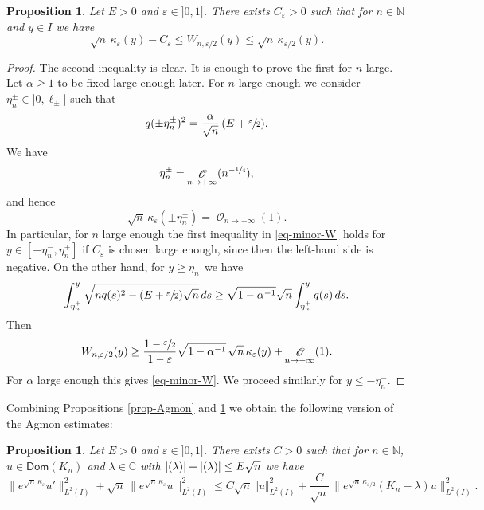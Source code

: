 \documentclass[11pt]{article}
\numberwithin{equation}{section}
\let\mathcal\mathscr
\theoremstyle{plain}
\newtheorem{proposition}[theorem]{Proposition}
\theoremstyle{definition}
\newcommand{\abs}[1]{\vert #1\vert}
\newcommand{\nr}[1]{\Vert #1\Vert}
\newcommand{\inv}{^{-1}}
\newcommand{\1}{\mathds 1}
\let\Re\relax
\DeclareMathOperator{\Re}{\mathsf{Re}\mkern2mu}
\let\Im\relax
\DeclareMathOperator{\Im}{\mathsf{Im}\mkern2mu}
\newcommand{\Dom}{\mathsf{Dom}}
\def\C{\mathbb{C}}
\newcommand{\N}{\mathbb{N}}
\let\a\alpha
\let\e\varepsilon
\let\k\kappa
\let\l\lambda
\newcommand{\Oc}{{\mathcal O}}
\begin{document}
\begin{proposition} \label{prop-W}
Let $E > 0$ and $\e \in{}]0,1]$. There exists $C_\e > 0$ such that for $n \in \N$ and $y \in I$ we have
\begin{equation} \label{eq-minor-W}
\sqrt n\,\kappa_\e (y) - C_\e \leq W_{n,\e/2}(y) \leq \sqrt n\,\kappa_{\e/2}(y) .
\end{equation}
\end{proposition}

\begin{proof}
The second inequality is clear. It is enough to prove the first for $n$ large. Let $\a \geq 1$ to be fixed large enough later. For $n$ large enough we consider $\eta_n^\pm \in{}]0,\ell_\pm]$ such that
\[
q(\pm \eta_n^\pm)^2 = \frac {\a}{\sqrt n}\,(E+ \sfrac \e 2).
\]
We have
\[
\eta_n^\pm = \mathop{\Oc}_{n \to +\infty}(n^{-\sfrac 14}),
\]
and hence
\begin{equation*}
\sqrt n\,\kappa_\e(\pm \eta_n^\pm) = \mathop{\Oc}_{n \to +\infty} (1).
\end{equation*}
In particular, for $n$ large enough the first inequality in \eqref{eq-minor-W} holds for $y \in [-\eta_n^-,\eta_n^+]$ if $C_\e$ is chosen large enough, since then the left-hand side is negative. On the other hand, for $y \geq \eta_n^+$ we have
\begin{align*}
\int_{\eta_n^+}^{y} \sqrt{nq(s)^2 -(E+\sfrac \e 2)\sqrt n} \, ds \geq \sqrt{1-\a \inv } \sqrt n \int_{\eta_n^+}^y q(s) \, ds.
\end{align*}
Then
\[
W_{n,\e/2}(y)
\geq \frac {1-\sfrac \e 2}{1 - \e} \sqrt{1-\a \inv }\, \sqrt n\,\kappa_\e(y) + \mathop{\Oc}_{n \to +\infty} (1).
\]
For $\a$ large enough this gives \eqref{eq-minor-W}. We proceed similarly for $y \leq -\eta_n^-$.
\end{proof}

Combining Propositions \ref{prop-Agmon} and \ref{prop-W} we obtain the following version of the Agmon estimates:

\begin{proposition} \label{prop-psi-L2}
Let $E > 0$ and $\e \in{}]0,1]$. There exists $C > 0$ such that for $n \in \N$, $u \in \Dom(K_n)$ and $\l \in \C$ with $\abs{\Re(\l)} + \abs{\Im(\l)} \leq E \sqrt n$ we have
\begin{equation*}
\big\|e^{\sqrt n\,\kappa_\e} u'\big\|_{L^2(I)}^2 + \sqrt n\,\big\|e^{\sqrt n\,\kappa_\e} u\big\|_{L^2(I)}^2
\leq C \sqrt n\,\nr{u}_{L^2(I)}^2 + \frac {C}{\sqrt n}\, \bigl\|e^{\sqrt n\,\k_{\e/2}} (K_n-\l)u\bigr\|_{L^2(I)}^2.
\end{equation*}
\end{proposition}
\end{document}
